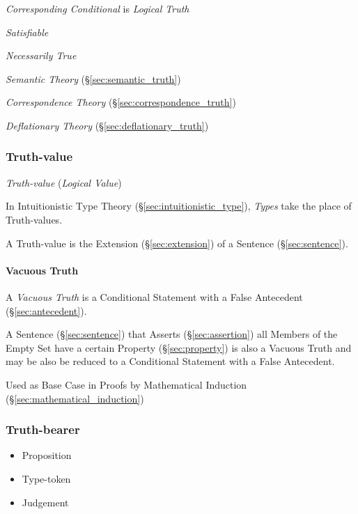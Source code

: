 \emph{Corresponding Conditional} is \emph{Logical Truth}

\emph{Satisfiable}

\emph{Necessarily True}

\emph{Semantic Theory} (\S\ref{sec:semantic_truth})

\emph{Correspondence Theory} (\S\ref{sec:correspondence_truth})

\emph{Deflationary Theory} (\S\ref{sec:deflationary_truth})



\subsubsection{Truth-value}\label{sec:truth_value}

\emph{Truth-value} (\emph{Logical Value})

In Intuitionistic Type Theory (\S\ref{sec:intuitionistic_type}),
\emph{Types} take the place of Truth-values.

A Truth-value is the Extension (\S\ref{sec:extension}) of a Sentence
(\S\ref{sec:sentence}).



\paragraph{Vacuous Truth}\label{sec:vacuous_truth}\hfill

A \emph{Vacuous Truth} is a Conditional Statement with a False
Antecedent (\S\ref{sec:antecedent}).

A Sentence (\S\ref{sec:sentence}) that Asserts (\S\ref{sec:assertion})
all Members of the Empty Set have a certain Property
(\S\ref{sec:property}) is also a Vacuous Truth and may be also be
reduced to a Conditional Statement with a False Antecedent.

Used as Base Case in Proofs by Mathematical Induction
(\S\ref{sec:mathematical_induction})



\subsubsection{Truth-bearer}\label{sec:truth_bearer}

\begin{itemize}
  \item Proposition
  \item Type-token
  \item Judgement
\end{itemize}



